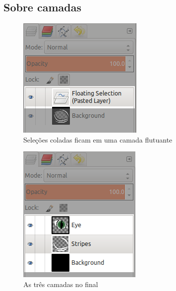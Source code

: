 \documentclass[12pt,onecolumn]{article}
\begin{document}
  \subsection{Sobre camadas}
    \begin{figure}[H]
      \centering
      \includegraphics[width=.5\textwidth]{screenshots/05-pasted_layer.png}
      \caption{Seleções coladas ficam em uma camada flutuante}
      \label{fig:pasted_layer}
    \end{figure}
    \begin{figure}[H]
      \centering
      \includegraphics[width=.5\textwidth]{screenshots/07-layers.png}
      \caption{As três camadas no final}
      \label{fig:layers}
    \end{figure}
    
\end{document}
